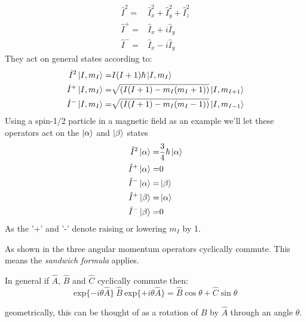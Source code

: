 \begin{align}
  \hat{I}^2 =& \hat{I}_x^2 + \hat{I}_y^2 + \hat{I}_z^2\\
  \hat{I}^+ =& \hat{I}_x + i\hat{I}_y\\
  \hat{I}^- =& \hat{I}_x - i\hat{I}_y
\end{align}
They act on general states according to:
\begin{align}
  \hat{I}^2\ket{I,m_I} =& I(I+1)\hbar\ket{I, m_I}\\
  \hat{I}^+\ket{I,m_I} =& \sqrt{(I(I+1)-m_I(m_I+1))}\ket{I,m_{I+1}}\\
  \hat{I}^-\ket{I,m_I} =& \sqrt{(I(I+1)-m_I(m_I-1))}\ket{I,m_{I-1}}
\end{align}
Using a spin-1/2 particle in a magnetic field as an example we'll let these operators act on the $\ket{\alpha}$ and $\ket{\beta}$ states
\begin{align}
  \hat{I}^2\ket{\alpha} =& \frac{3}{4}\hbar\ket{\alpha}\\
  \hat{I}^+\ket{\alpha} =& 0\\
  \hat{I}^-\ket{\alpha} =& \ket{\beta}\\
  \hat{I}^+\ket{\beta} =& \ket{\alpha}\\
  \hat{I}^-\ket{\beta} =& 0
\end{align}
As the '+' and '-' denote raising or lowering $m_I$ by 1.

As shown in  the three angular momentum operators cyclically
commute. This means the \textit{sandwich formula} applies.

In general if $\hat{A}$, $\hat{B}$ and $\hat{C}$ cyclically commute then:
\begin{equation}
  \text{exp}\{-i\theta\hat{A}\}\:\hat{B}\:\text{exp}\{+i\theta\hat{A}\} = \hat{B}\cos{\theta} + \hat{C}\sin{\theta}
\end{equation}

geometrically, this can be thought of as a rotation of $\hat{B}$ by $\hat{A}$ through
an angle $\theta$.

